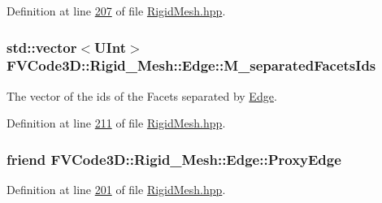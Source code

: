 Definition at line \hyperlink{RigidMesh_8hpp_source_l00207}{207} of file \hyperlink{RigidMesh_8hpp_source}{Rigid\+Mesh.\+hpp}.

\subsubsection[{\texorpdfstring{M\+\_\+separated\+Facets\+Ids}{M_separatedFacetsIds}}]{\setlength{\rightskip}{0pt plus 5cm}std\+::vector$<${\bf U\+Int}$>$ F\+V\+Code3\+D\+::\+Rigid\+\_\+\+Mesh\+::\+Edge\+::\+M\+\_\+separated\+Facets\+Ids\hspace{0.3cm}{\ttfamily [protected]}}\hypertarget{classFVCode3D_1_1Rigid__Mesh_1_1Edge_a4fd7d85c6c2a87a784ac65618785faf5}{}\label{classFVCode3D_1_1Rigid__Mesh_1_1Edge_a4fd7d85c6c2a87a784ac65618785faf5}


The vector of the ids of the Facets separated by \hyperlink{classFVCode3D_1_1Rigid__Mesh_1_1Edge}{Edge}. 



Definition at line \hyperlink{RigidMesh_8hpp_source_l00211}{211} of file \hyperlink{RigidMesh_8hpp_source}{Rigid\+Mesh.\+hpp}.

\subsubsection[{\texorpdfstring{Proxy\+Edge}{ProxyEdge}}]{\setlength{\rightskip}{0pt plus 5cm}friend F\+V\+Code3\+D\+::\+Rigid\+\_\+\+Mesh\+::\+Edge\+::\+Proxy\+Edge}\hypertarget{classFVCode3D_1_1Rigid__Mesh_1_1Edge_a67d5b2a6f94834a5255f92e31552dd76}{}\label{classFVCode3D_1_1Rigid__Mesh_1_1Edge_a67d5b2a6f94834a5255f92e31552dd76}


Definition at line \hyperlink{RigidMesh_8hpp_source_l00201}{201} of file \hyperlink{RigidMesh_8hpp_source}{Rigid\+Mesh.\+hpp}.

